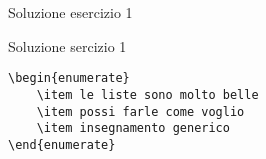\begin{frame}[fragile]{Soluzione esercizio 1}

\begin{block}{Soluzione sercizio 1}
\begin{lstlisting}
\begin{enumerate}
	\item le liste sono molto belle
	\item possi farle come voglio
	\item insegnamento generico
\end{enumerate}
\end{lstlisting}
\end{block}

\end{frame}